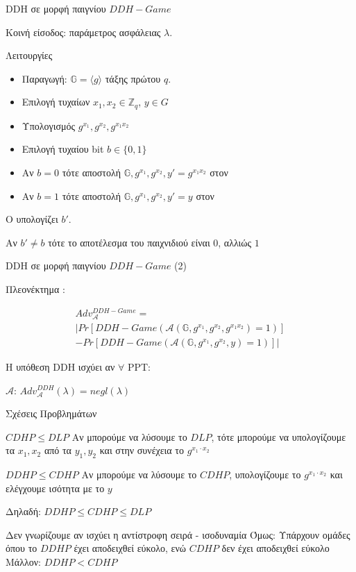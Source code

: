 \documentclass[handout]{beamer}
\begin{document}
\begin{frame}{DDH σε μορφή παιγνίου $DDH-Game$}
\begin{small}
Κοινή είσοδος: παράμετρος ασφάλειας $\lambda$.

Λειτουργίες \chal
\begin{itemize}
	\item Παραγωγή: $\mathbb{G}=\langle g \rangle$ τάξης πρώτου $q$. 
	\item Επιλογή τυχαίων $x_1,x_2 \in \mathbb{Z}_q$, $y \in G$
	\item Υπολογισμός $g^{x_1}, g^{x_2}, g^{x_1 x_2}$
	\item Επιλογή τυχαίου bit $b \in \{ 0,1 \}$
	\item Αν $b=0$ τότε αποστολή $\mathbb{G}, g^{x_1}, g^{x_2}, y' = g^{x_1 x_2}$ στον \adv
	\item Αν $b=1$ τότε αποστολή $\mathbb{G}, g^{x_1}, g^{x_2},y' = y$ στον \adv
\end{itemize}	

O \adv υπολογίζει $b'$. 

Αν $b'\neq b$ τότε το αποτέλεσμα του παιχνιδιού είναι $0$, αλλιώς $1$
\end{small}
\end{frame}

\begin{frame}{DDH σε μορφή παιγνίου $DDH-Game$ (2)}

Πλεονέκτημα \adv:

\begin{align*} Adv_{\mathcal{A}}^{DDH-Game} = \\
| Pr[DDH-Game(\mathcal{A}(\mathbb{G},g^{x_1}, g^{x_2}, g^{x_1 x_2})=1)] \\
  - Pr[DDH-Game(\mathcal{A}(\mathbb{G},g^{x_1}, g^{x_2}, y)=1)] |
\end{align*}

Η υπόθεση DDH ισχύει αν $\forall$ PPT:

$\mathcal{A}$: $Adv_{\mathcal{A}}^{DDH}(\lambda) = negl(\lambda)$

\end{frame}

\begin{frame}{Σχέσεις Προβλημάτων}
\begin{block}{$CDHP \leq DLP$}
Αν μπορούμε να λύσουμε το $DLP$, τότε μπορούμε να υπολογίζουμε τα $x_1, x_2$ από τα $y_1, y_2$ και στην συνέχεια το $g^{x_1 \cdot x_2}$
\end{block}

\pause
 
\begin{block}{$DDHP \leq CDHP$}
Αν μπορούμε να λύσουμε το $CDHP$, υπολογίζουμε το $g^{x_1 \cdot x_2}$ και ελέγχουμε ισότητα με το $y$
\end{block}
 
\pause 
Δηλαδή: $DDHP \leq CDHP \leq DLP$

\alert{Δεν γνωρίζουμε αν ισχύει η αντίστροφη σειρά - ισοδυναμία}
\alert{Όμως:}
Υπάρχουν ομάδες όπου το $DDHP$ έχει αποδειχθεί εύκολο, ενώ $CDHP$ δεν έχει αποδειχθεί εύκολο\\
\alert{Μάλλον:} $DDHP < CDHP$
\end{frame}
\end{document}
